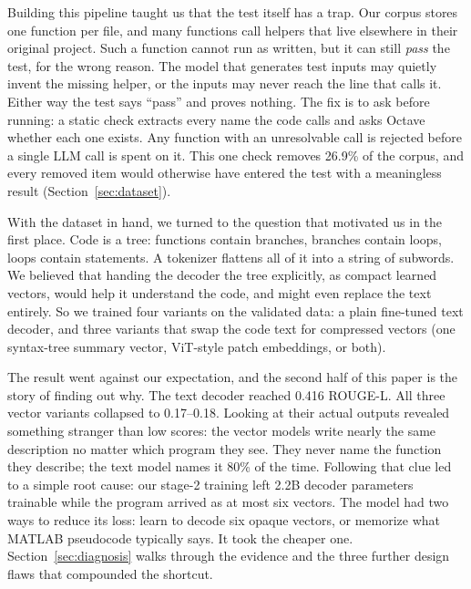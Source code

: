 \documentclass[conference]{IEEEtran}
\begin{document}
Building this pipeline taught us that the test itself has a trap. Our corpus stores one function per file, and many functions call helpers that live elsewhere in their original project. Such a function cannot run as written, but it can still \emph{pass} the test, for the wrong reason. The model that generates test inputs may quietly invent the missing helper, or the inputs may never reach the line that calls it. Either way the test says ``pass'' and proves nothing. The fix is to ask before running: a static check extracts every name the code calls and asks Octave whether each one exists. Any function with an unresolvable call is rejected before a single LLM call is spent on it. This one check removes 26.9\% of the corpus, and every removed item would otherwise have entered the test with a meaningless result (Section~\ref{sec:dataset}).

With the dataset in hand, we turned to the question that motivated us in the first place. Code is a tree: functions contain branches, branches contain loops, loops contain statements. A tokenizer flattens all of it into a string of subwords. We believed that handing the decoder the tree explicitly, as compact learned vectors, would help it understand the code, and might even replace the text entirely. So we trained four variants on the validated data: a plain fine-tuned text decoder, and three variants that swap the code text for compressed vectors (one syntax-tree summary vector, ViT-style patch embeddings, or both).

The result went against our expectation, and the second half of this paper is the story of finding out why. The text decoder reached 0.416 ROUGE-L. All three vector variants collapsed to 0.17--0.18. Looking at their actual outputs revealed something stranger than low scores: the vector models write nearly the same description no matter which program they see. They never name the function they describe; the text model names it 80\% of the time. Following that clue led to a simple root cause: our stage-2 training left 2.2B decoder parameters trainable while the program arrived as at most six vectors. The model had two ways to reduce its loss: learn to decode six opaque vectors, or memorize what MATLAB pseudocode typically says. It took the cheaper one. Section~\ref{sec:diagnosis} walks through the evidence and the three further design flaws that compounded the shortcut.
\end{document}
